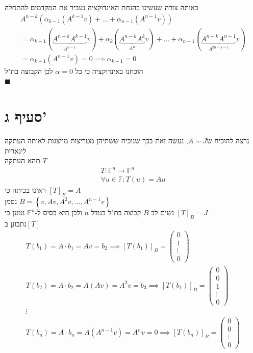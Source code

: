 \documentclass[12pt, titlepage]{article}
\begin{document}
באותה צורה שעשינו בהנחת האינדוקציה נעביר את המקדמים להתחלה
\begin{gather*}
    A^{n-k}\left(\alpha_{k-1}\left(A^{k-1}v\right)+\ldots+\alpha_{n-1}\left(A^{n-1}v\right)\right) \\
= \alpha_{k-1}\left(\underbrace{A^{n-k}A^{k-1}}_{A^{n-1}}v\right)+\alpha_{k}\left(\underbrace{A^{n-k}A^{k}}_{A^n}v\right)+\ldots+\alpha_{n-1}\left(\underbrace{A^{n-k}A^{n-1}}_{A^{2n-k-1}}v\right) \\
= \alpha_{k-1} \left(A^{n-1}v\right) =0 \implies \alpha_{k-1}=0
\end{gather*}
הוכחנו באינדוקציה כי כל $\alpha=0$ לכן הקבוצה בת"ל\\
$\blacksquare$
\section*{סעיף ג'}
נרצה להוכיח ש$A\sim J$, נעשה זאת בכך שנוכיח ששתיהן מטריצות מייצגות לאותה העתקה לינארית\\
תהא העתקה $T$
\begin{gather*}
    T:\mathbb{F}^n \to \mathbb{F}^n\\
    \forall u\in\mathbb{F}: T\left(u\right) = Au
\end{gather*}
ראינו בכיתה כי $\left[T\right]_E = A$\\
נסמן $B=\left\{v,Av,A^2v,\ldots,A^{n-1}v\right\}$ \\
נשים לב $B$ קבוצה בת"ל בגודל $n$ ולכן היא בסיס ל-$\mathbb{F}^n$
נטען כי $\left[T\right]_B = J$\\
נתבונן ב$\left[T\right]$
\begin{gather*}
T\left(b_1\right) = A\cdot b_1 = Av = b_2 \implies \left[T\left(b_1\right)\right]_B = \begin{pmatrix}0\\1\\\vdots\\0\end{pmatrix}\\
T\left(b_2\right) = A\cdot b_2 = A\left(Av\right) = A^2v = b_3 \implies \left[T\left(b_1\right)\right]_B = \begin{pmatrix}0\\0\\1\\\vdots\\0\end{pmatrix}\\
\vdots\\
T\left(b_n\right) = A\cdot b_n = A\left(A^{n-1}v\right) = A^nv = 0 \implies \left[T\left(b_n\right)\right]_B = \begin{pmatrix}0\\0\\\vdots\\0\end{pmatrix}
\end{gather*}
\end{document}
